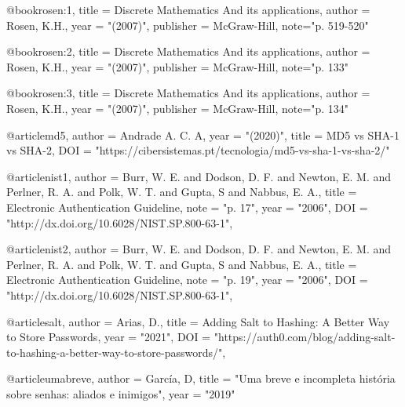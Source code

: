 @book{rosen:1,
	title = {Discrete Mathematics And its applications},
	author = {Rosen, K.H.},
	year = "(2007)",
	publisher = {McGraw-Hill},
	note="p. 519-520"
}

@book{rosen:2,
	title = {Discrete Mathematics And its applications},
	author = {Rosen, K.H.},
	year = "(2007)",
	publisher = {McGraw-Hill},
	note="p. 133"
}

@book{rosen:3,
	title = {Discrete Mathematics And its applications},
	author = {Rosen, K.H.},
	year = "(2007)",
	publisher = {McGraw-Hill},
	note="p. 134"
}

@article{md5,
	author = {Andrade A. C. A},
	year = "(2020)",
	title = {MD5 vs SHA-1 vs SHA-2},
	DOI = "https://cibersistemas.pt/tecnologia/md5-vs-sha-1-vs-sha-2/"
}

@article{nist1,
	author = {Burr, W. E. and Dodson, D. F. and Newton, E. M. and Perlner, R. A. and Polk, W. T. and Gupta, S and Nabbus, E. A.},
	title = {Electronic Authentication Guideline},
	note = "p. 17",
	year = "2006",
	DOI = "http://dx.doi.org/10.6028/NIST.SP.800-63-1",
}

@article{nist2,
	author = {Burr, W. E. and Dodson, D. F. and Newton, E. M. and Perlner, R. A. and Polk, W. T. and Gupta, S and Nabbus, E. A.},
	title = {Electronic Authentication Guideline},
	note = "p. 19",
	year = "2006",
	DOI = "http://dx.doi.org/10.6028/NIST.SP.800-63-1",
}

@article{salt,
	author = {Arias, D.},
	title = {Adding Salt to Hashing: A Better Way to Store Passwords},
	year = "2021",
	DOI = "https://auth0.com/blog/adding-salt-to-hashing-a-better-way-to-store-passwords/",
}

@article{umabreve,
	author = {García, D},
	title = "Uma breve e incompleta história sobre senhas: aliados e inimigos",
	year = "2019"
}
